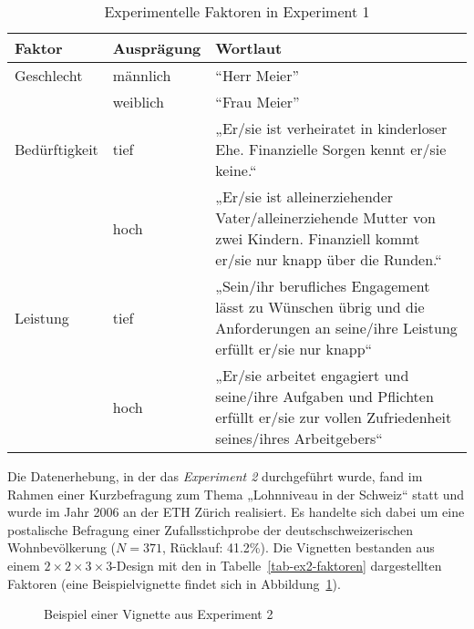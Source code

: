 \documentclass[a4paper,12pt]{article}
\begin{document}
\begin{table}
    \small
    \caption{Experimentelle Faktoren in Experiment 1}\label{tab-ex1-faktoren}
    \begin{tabularx}{\textwidth}{@{}llX@{}}
        \toprule
        Faktor          & Ausprägung & Wortlaut       \\\midrule
        Geschlecht      & männlich     & “Herr Meier”   \\
                        & weiblich     & “Frau Meier”   \\
        \addlinespace
        Bedürftigkeit   & tief         & „Er/sie ist verheiratet in kinderloser Ehe. Finanzielle Sorgen kennt er/sie keine.“ \\
                        & hoch         & „Er/sie ist alleinerziehender Vater/alleinerziehende Mutter von zwei Kindern. Finanziell kommt er/sie nur knapp über die Runden.“ \\
        \addlinespace
        Leistung        & tief         & „Sein/ihr berufliches Engagement lässt zu Wünschen übrig und die Anforderungen an seine/ihre Leistung erfüllt er/sie nur knapp“   \\
                        & hoch         & „Er/sie arbeitet engagiert und seine/ihre Aufgaben und Pflichten erfüllt er/sie zur vollen Zufriedenheit seines/ihres Arbeitgebers“  \\
        \bottomrule
    \end{tabularx}
\end{table}

Die Datenerhebung, in der das \emph{Experiment 2} durchgeführt wurde, fand im Rahmen einer Kurzbefragung zum
Thema „Lohnniveau in der Schweiz“ statt und wurde im Jahr 2006 an der ETH
Zürich realisiert. Es handelte sich dabei um eine postalische Befragung einer
Zufallsstichprobe der deutschschweizerischen Wohnbevölkerung ($N = 371$,
Rücklauf: 41.2\%). Die Vignetten bestanden aus einem $2 \times 2 \times 3 \times
3$-Design mit den in Tabelle~\ref{tab-ex2-faktoren} dargestellten Faktoren (eine Beispielvignette findet sich in
Abbildung~\ref{fig-2}). 

\begin{figure}\centering
    \caption{Beispiel einer Vignette aus Experiment 2}\label{fig-2}
\end{figure}
\end{document}
